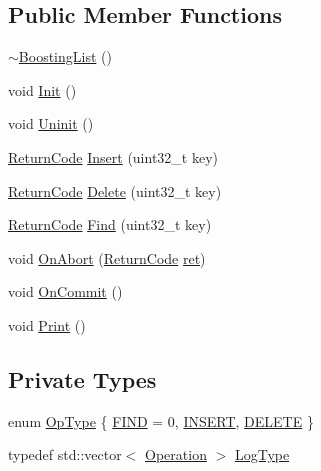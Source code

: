 \subsection*{Public Member Functions}
\begin{DoxyCompactItemize}
\item 
\hyperlink{classBoostingList_a08f1377e4f6884462825a06dccf32113}{$\sim$\-Boosting\-List} ()
\item 
void \hyperlink{classBoostingList_af7c649904a89588638500e381411ca0a}{Init} ()
\item 
void \hyperlink{classBoostingList_a180ef6457c6af66f499061846690a9ac}{Uninit} ()
\item 
\hyperlink{classBoostingList_abcaa163088b2562f0704b16a56a4a97a}{Return\-Code} \hyperlink{classBoostingList_a16bf3043fb4368961fffc400cef1953d}{Insert} (uint32\-\_\-t key)
\item 
\hyperlink{classBoostingList_abcaa163088b2562f0704b16a56a4a97a}{Return\-Code} \hyperlink{classBoostingList_ad0ab949b2089c509eef7e21357080ae0}{Delete} (uint32\-\_\-t key)
\item 
\hyperlink{classBoostingList_abcaa163088b2562f0704b16a56a4a97a}{Return\-Code} \hyperlink{classBoostingList_a9b9a0ffe922bfb9af08196219105424f}{Find} (uint32\-\_\-t key)
\item 
void \hyperlink{classBoostingList_add73a97e46b96edaf01a3de3b185fd53}{On\-Abort} (\hyperlink{classBoostingList_abcaa163088b2562f0704b16a56a4a97a}{Return\-Code} \hyperlink{stmskip_8cc_a339672ff94e6199019102f50d317c3d7}{ret})
\item 
void \hyperlink{classBoostingList_a18e4a2f06898eb275acaae233da9e5b3}{On\-Commit} ()
\item 
void \hyperlink{classBoostingList_a2ad6950bb2e21931e056240abd22fcce}{Print} ()
\end{DoxyCompactItemize}
\subsection*{Private Types}
\begin{DoxyCompactItemize}
\item 
enum \hyperlink{classBoostingList_aa6ead29373e5c60d7a87ffdc67e2abe1}{Op\-Type} \{ \hyperlink{classBoostingList_aa6ead29373e5c60d7a87ffdc67e2abe1ab23f0ef1da0239f6a46a60baf184f447}{F\-I\-N\-D} = 0, 
\hyperlink{classBoostingList_aa6ead29373e5c60d7a87ffdc67e2abe1a98c46fd10933eeff93a5826c9e721466}{I\-N\-S\-E\-R\-T}, 
\hyperlink{classBoostingList_aa6ead29373e5c60d7a87ffdc67e2abe1a5f21478a8a6823d3e395dd054724409e}{D\-E\-L\-E\-T\-E}
 \}
\item 
typedef std\-::vector$<$ \hyperlink{structBoostingList_1_1Operation}{Operation} $>$ \hyperlink{classBoostingList_aff446bc12b9d63259726601a952d8479}{Log\-Type}
\end{DoxyCompactItemize}
